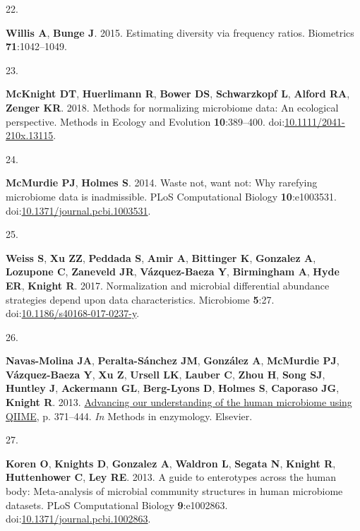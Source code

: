 \documentclass[
]{article}
\newlength{\cslhangindent}
\newlength{\csllabelwidth}
\newlength{\cslentryspacingunit} %
\newenvironment{CSLReferences}[2] %
 {%
  \setlength{\parindent}{0pt}
  \ifodd #1
  \let\oldpar\par
  \def\par{\hangindent=\cslhangindent\oldpar}
  \fi
  \setlength{\parskip}{#2\cslentryspacingunit}
 }%
 {}
\newcommand{\CSLLeftMargin}[1]{\parbox[t]{\csllabelwidth}{#1}}
\newcommand{\CSLRightInline}[1]{\parbox[t]{\linewidth - \csllabelwidth}{#1}\break}
\begin{document}
\begin{CSLReferences}{0}{1}
\leavevmode{}%
\CSLLeftMargin{22. }%
\CSLRightInline{\textbf{Willis A}, \textbf{Bunge J}. 2015. Estimating
diversity via frequency ratios. Biometrics \textbf{71}:1042--1049.}

\leavevmode{}%
\CSLLeftMargin{23. }%
\CSLRightInline{\textbf{McKnight DT}, \textbf{Huerlimann R},
\textbf{Bower DS}, \textbf{Schwarzkopf L}, \textbf{Alford RA},
\textbf{Zenger KR}. 2018. Methods for normalizing microbiome data: An
ecological perspective. Methods in Ecology and Evolution
\textbf{10}:389--400.
doi:\href{https://doi.org/10.1111/2041-210x.13115}{10.1111/2041-210x.13115}.}

\leavevmode{}%
\CSLLeftMargin{24. }%
\CSLRightInline{\textbf{McMurdie PJ}, \textbf{Holmes S}. 2014. Waste
not, want not: Why rarefying microbiome data is inadmissible. {PLoS}
Computational Biology \textbf{10}:e1003531.
doi:\href{https://doi.org/10.1371/journal.pcbi.1003531}{10.1371/journal.pcbi.1003531}.}

\leavevmode{}%
\CSLLeftMargin{25. }%
\CSLRightInline{\textbf{Weiss S}, \textbf{Xu ZZ}, \textbf{Peddada S},
\textbf{Amir A}, \textbf{Bittinger K}, \textbf{Gonzalez A},
\textbf{Lozupone C}, \textbf{Zaneveld JR}, \textbf{Vázquez-Baeza Y},
\textbf{Birmingham A}, \textbf{Hyde ER}, \textbf{Knight R}. 2017.
Normalization and microbial differential abundance strategies depend
upon data characteristics. Microbiome \textbf{5}:27.
doi:\href{https://doi.org/10.1186/s40168-017-0237-y}{10.1186/s40168-017-0237-y}.}

\leavevmode{}%
\CSLLeftMargin{26. }%
\CSLRightInline{\textbf{Navas-Molina JA}, \textbf{Peralta-Sánchez JM},
\textbf{González A}, \textbf{McMurdie PJ}, \textbf{Vázquez-Baeza Y},
\textbf{Xu Z}, \textbf{Ursell LK}, \textbf{Lauber C}, \textbf{Zhou H},
\textbf{Song SJ}, \textbf{Huntley J}, \textbf{Ackermann GL},
\textbf{Berg-Lyons D}, \textbf{Holmes S}, \textbf{Caporaso JG},
\textbf{Knight R}. 2013.
\href{https://doi.org/10.1016/b978-0-12-407863-5.00019-8}{Advancing our
understanding of the human microbiome using {QIIME}}, p. 371--444.
\emph{In} Methods in enzymology. Elsevier.}

\leavevmode{}%
\CSLLeftMargin{27. }%
\CSLRightInline{\textbf{Koren O}, \textbf{Knights D}, \textbf{Gonzalez
A}, \textbf{Waldron L}, \textbf{Segata N}, \textbf{Knight R},
\textbf{Huttenhower C}, \textbf{Ley RE}. 2013. A guide to enterotypes
across the human body: Meta-analysis of microbial community structures
in human microbiome datasets. {PLoS} Computational Biology
\textbf{9}:e1002863.
doi:\href{https://doi.org/10.1371/journal.pcbi.1002863}{10.1371/journal.pcbi.1002863}.}


\end{CSLReferences}
\end{document}

